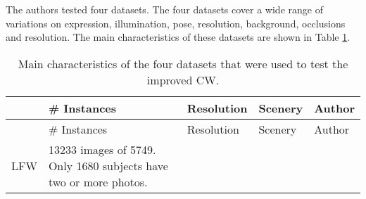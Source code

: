 \documentclass[]{article}
\begin{document}
The authors tested four datasets. The four datasets cover a wide range of variations on expression, illumination, pose, resolution, background, occlusions and resolution. The main characteristics of these datasets are shown in Table \ref{tab:table1}.

\small

\begin{longtable}[]{@{}lllll@{}}
\caption{\label{tab:table1} Main characteristics of the four datasets that were used to test the improved CW.}\tabularnewline
\toprule
\begin{minipage}[b]{0.09\columnwidth}\raggedright
\strut
\end{minipage} & \begin{minipage}[b]{0.24\columnwidth}\raggedright
\# Instances\strut
\end{minipage} & \begin{minipage}[b]{0.14\columnwidth}\raggedright
Resolution\strut
\end{minipage} & \begin{minipage}[b]{0.19\columnwidth}\raggedright
Scenery\strut
\end{minipage} & \begin{minipage}[b]{0.20\columnwidth}\raggedright
Author\strut
\end{minipage}\tabularnewline
\midrule
\endfirsthead
\toprule
\begin{minipage}[b]{0.09\columnwidth}\raggedright
\strut
\end{minipage} & \begin{minipage}[b]{0.24\columnwidth}\raggedright
\# Instances\strut
\end{minipage} & \begin{minipage}[b]{0.14\columnwidth}\raggedright
Resolution\strut
\end{minipage} & \begin{minipage}[b]{0.19\columnwidth}\raggedright
Scenery\strut
\end{minipage} & \begin{minipage}[b]{0.20\columnwidth}\raggedright
Author\strut
\end{minipage}\tabularnewline
\midrule
\endhead
\begin{minipage}[t]{0.09\columnwidth}\raggedright
LFW\strut
\end{minipage} & \begin{minipage}[t]{0.24\columnwidth}\raggedright
13233 images of 5749. Only 1680 subjects have two or more photos.\strut
\end{minipage} & \begin{minipage}[t]{0.14\columnwidth}\raggedright

\end{minipage}
\end{longtable}
\end{document}
